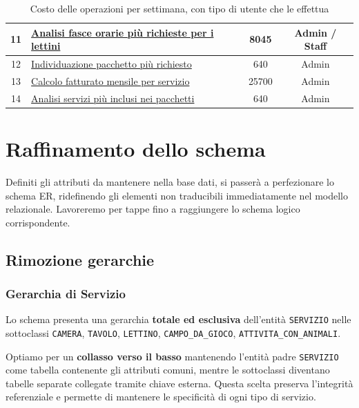 \documentclass[a4paper,12pt]{report}
\begin{document}
\begin{table}[H]
\begin{tabularx}{\textwidth}{|c|>{\raggedright\arraybackslash}X|c|c|}
		\hline
		11          & \hyperref[op11]{Analisi fasce orarie più richieste per i lettini}     & 8045                      & Admin / Staff        \\
		\hline
		12          & \hyperref[op12]{Individuazione pacchetto più richiesto}               & 640                       & Admin                \\
		\hline
		13          & \hyperref[op13]{Calcolo fatturato mensile per servizio}               & 25700                     & Admin                \\
		\hline
		14          & \hyperref[op14]{Analisi servizi più inclusi nei pacchetti}            & 640                       & Admin                \\
		\hline
	\end{tabularx}
	\caption{Costo delle operazioni per settimana, con tipo di utente che le effettua}
	\label{tab:costo-operazioni-settimanali}
\end{table}


\newpage
\section{Raffinamento dello schema}
Definiti gli attributi da mantenere nella base dati, si passerà a perfezionare lo schema ER, ridefinendo gli elementi non
traducibili immediatamente nel modello relazionale. Lavoreremo per tappe fino a raggiungere lo schema logico corrispondente.

\subsection{Rimozione gerarchie}

\subsubsection*{Gerarchia di Servizio}
Lo schema presenta una gerarchia \textbf{totale ed esclusiva} dell'entità \texttt{SERVIZIO} nelle sottoclassi
\texttt{CAMERA}, \texttt{TAVOLO}, \texttt{LETTINO}, \texttt{CAMPO\_DA\_GIOCO}, \texttt{ATTIVITA\_CON\_ANIMALI}.

Optiamo per un \textbf{collasso verso il basso} mantenendo l'entità padre \texttt{SERVIZIO} come tabella contenente gli
attributi comuni, mentre le sottoclassi diventano tabelle separate collegate tramite chiave esterna. Questa scelta preserva
l'integrità referenziale e permette di mantenere le specificità di ogni tipo di servizio.
\end{document}
